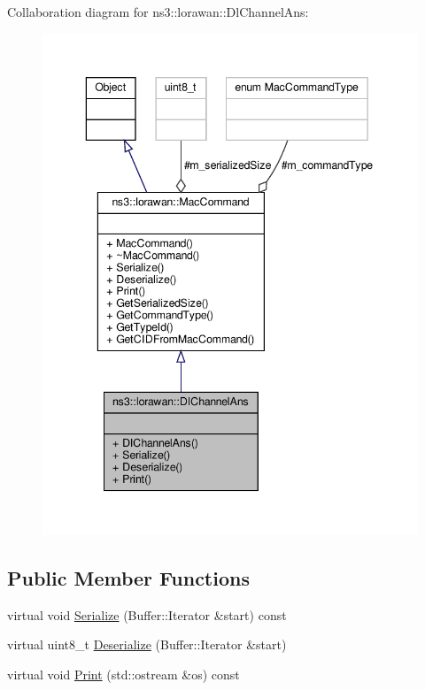Collaboration diagram for ns3\+:\+:lorawan\+:\+:Dl\+Channel\+Ans\+:
\nopagebreak
\begin{figure}[H]
\begin{center}
\leavevmode
\includegraphics[width=343pt]{classns3_1_1lorawan_1_1DlChannelAns__coll__graph}
\end{center}
\end{figure}
\subsection*{Public Member Functions}
\begin{DoxyCompactItemize}
\item 
virtual void \hyperlink{classns3_1_1lorawan_1_1DlChannelAns_a9fef6b765888e26a0031757b435028a0}{Serialize} (Buffer\+::\+Iterator \&start) const
\item 
virtual uint8\+\_\+t \hyperlink{classns3_1_1lorawan_1_1DlChannelAns_a15482fde8754d5fa211754ef2352e514}{Deserialize} (Buffer\+::\+Iterator \&start)
\item 
virtual void \hyperlink{classns3_1_1lorawan_1_1DlChannelAns_a1dbe96549927ce3aa98c8d68a341f5bd}{Print} (std\+::ostream \&os) const
\end{DoxyCompactItemize}
